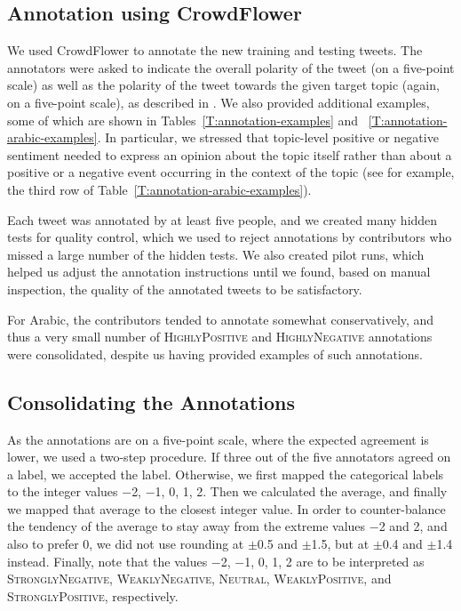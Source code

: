 \documentclass[11pt,a4paper]{article}
\begin{document}
\subsection{Annotation using CrowdFlower}

We used CrowdFlower to annotate the new training and testing tweets. The annotators were asked to indicate the overall polarity of the tweet (on a five-point scale) as well as the polarity of the tweet towards the given target topic (again, on a five-point scale), as described in \cite{nakov-EtAl:2016:SemEval1}.
We also provided additional examples, some of which are shown in Tables~\ref{T:annotation-examples} and ~\ref{T:annotation-arabic-examples}. In particular, we stressed that topic-level positive or negative sentiment needed to express an opinion about the topic itself rather than about a positive or a negative event occurring in the context of the topic (see for example, the third row of Table~\ref{T:annotation-arabic-examples}).

Each tweet was annotated by at least five people, and we created many hidden tests for quality control, which we used to reject annotations by contributors who missed a large number of the hidden tests. We also created pilot runs, which helped us adjust the annotation instructions until we found, based on manual inspection, the quality of the annotated tweets to be satisfactory.


\noindent For Arabic, the contributors tended to annotate somewhat conservatively, and thus a very small number of \textsc{HighlyPositive} and \textsc{HighlyNegative} annotations were consolidated, despite us having provided examples of such annotations. 

\subsection{Consolidating the Annotations} 

As the annotations are on a five-point scale, where the
expected agreement is lower, we used a two-step procedure. If three
out of the five annotators agreed on a label, we accepted the label.
Otherwise, we first mapped the categorical labels to the integer
values $-$2, $-$1, 0, 1, 2. Then we calculated the average, and
finally we mapped that average to the closest integer value. In order
to counter-balance the tendency of the average to stay away from the extreme values
$-$2 and 2, and also to prefer 0, we did not use rounding at $\pm$0.5
and $\pm$1.5, but at $\pm$0.4 and $\pm$1.4 instead.
Finally, note that the values $-$2, $-$1, 0, 1, 2 are to be interpreted as \textsc{StronglyNegative}, \textsc{WeaklyNegative}, \textsc{Neutral}, \textsc{WeaklyPositive}, and \textsc{StronglyPositive}, respectively.
\end{document}
